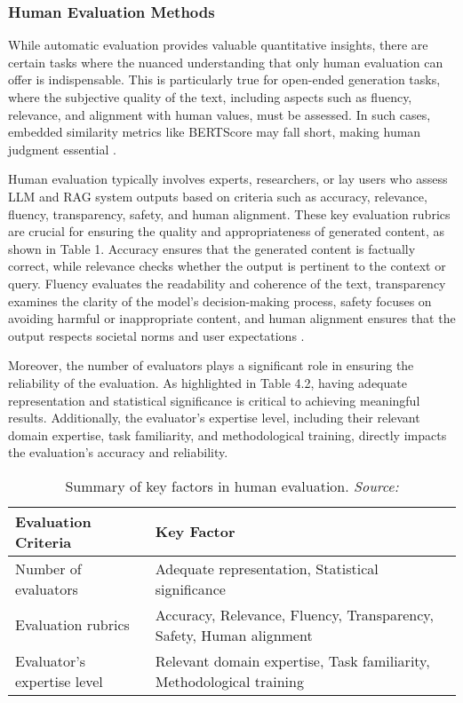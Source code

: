 \subsubsection{Human Evaluation Methods}

While automatic evaluation provides valuable quantitative insights, there are certain tasks where the nuanced understanding that only human evaluation can offer is indispensable. This is particularly true for open-ended generation tasks, where the subjective quality of the text, including aspects such as fluency, relevance, and alignment with human values, must be assessed. In such cases, embedded similarity metrics like BERTScore may fall short, making human judgment essential \cite{novikova2017we}.

Human evaluation typically involves experts, researchers, or lay users who assess LLM and RAG system outputs based on criteria such as accuracy, relevance, fluency, transparency, safety, and human alignment. These key evaluation rubrics are crucial for ensuring the quality and appropriateness of generated content, as shown in Table 1. Accuracy ensures that the generated content is factually correct, while relevance checks whether the output is pertinent to the context or query. Fluency evaluates the readability and coherence of the text, transparency examines the clarity of the model’s decision-making process, safety focuses on avoiding harmful or inappropriate content, and human alignment ensures that the output respects societal norms and user expectations \cite{chang2024survey}.

Moreover, the number of evaluators plays a significant role in ensuring the reliability of the evaluation. As highlighted in Table 4.2, having adequate representation and statistical significance is critical to achieving meaningful results. Additionally, the evaluator’s expertise level, including their relevant domain expertise, task familiarity, and methodological training, directly impacts the evaluation’s accuracy and reliability.

\begin{table}[h!]
\centering
\begin{tabular}{|l|l|}
\hline
\textbf{Evaluation Criteria} & \textbf{Key Factor} \\ \hline
Number of evaluators & Adequate representation, Statistical significance \\ \hline
Evaluation rubrics & Accuracy, Relevance, Fluency, Transparency, Safety, Human alignment \\ \hline
Evaluator’s expertise level & Relevant domain expertise, Task familiarity, Methodological training \\ \hline
\end{tabular}
\caption{Summary of key factors in human evaluation. \textit{Source:} \cite{chang2024survey}}
\end{table}

